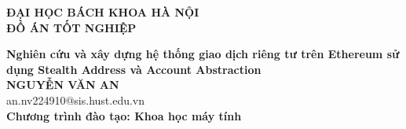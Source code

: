 \documentclass[DoAn.tex]{subfiles}
\begin{document}
\begin{titlepage}
\thispagestyle{empty}
\begin{center}

{\textbf{\large{ĐẠI HỌC BÁCH KHOA HÀ NỘI}}}\\[4cm]

{\textbf{\huge{ ĐỒ ÁN TỐT NGHIỆP}}}\\[1cm]
{\textbf{\Large{Nghiên cứu và xây dựng hệ thống giao dịch riêng tư trên Ethereum sử dụng Stealth Address và Account Abstraction}}\\[1cm]

{\textbf{\large{NGUYỄN VĂN AN}}}\\
{\large{an.nv224910@sis.hust.edu.vn}}\\[0.5cm]

{\textbf{\large{Chương trình đào tạo: Khoa học máy tính
}}}\\

\vspace{4cm}
\begin{table}[H]
\centering
{}
\end{table}}
\end{center}



\end{titlepage}
\end{document}
